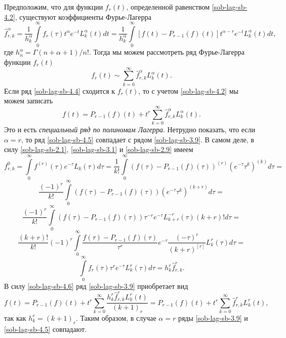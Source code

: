 Предположим, что для функции $f_r(t)$, определенной равенством \eqref{sob-lag-sb-4.2}, существуют коэффициенты Фурье-Лагерра
\begin{equation}\label{sob-lag-sb-4.3}
\hat{f}_{r,k}^\alpha=\frac1{h_k^\alpha}\int\limits_0^\infty f_r(\tau)t^\alpha e^{-t}L_k^\alpha(t)dt=
  \frac1{h_k^\alpha}\int\limits_0^\infty [f(t)-P_{r-1}(f)(t)]t^{\alpha-r}e^{-t}L_k^\alpha(t)dt,
\end{equation}
где $h_n^\alpha=\Gamma(n+\alpha+1)/n!$.
Тогда мы можем рассмотреть ряд Фурье-Лагерра функции $f_r(t)$
\begin{equation}\label{sob-lag-sb-4.4}
  f_r(t)\sim\sum\limits_{k=0}^\infty\hat{f}_{r,k}^\alpha L_k^\alpha(t).
\end{equation}
Если ряд \eqref{sob-lag-sb-4.4} сходится к $f_r(t)$, то с учетом \eqref{sob-lag-sb-4.2} мы можем записать
\begin{equation}\label{sob-lag-sb-4.5}
  f(t)=P_{r-1}(f)(t)+t^r\sum\limits_{k=0}^\infty\hat{f}_{r,k}^\alpha L_k^\alpha(t).
\end{equation}
 Это и есть \textit{специальный ряд по полиномам Лагерра}.
 Нетрудно показать, что если $\alpha=r$, то ряд \eqref{sob-lag-sb-4.5} совпадает с рядом \eqref{sob-lag-sb-3.9}. В самом деле, в силу \eqref{sob-lag-sb-2.1},  \eqref{sob-lag-sb-3.1} и \eqref{sob-lag-sb-2.9} имеем
\begin{equation*}
  {f}_{r,k}^0=\int\limits_0^\infty f^{(r)}(\tau)e^{-\tau}L_k(\tau)d\tau=\frac1{k!}\int\limits_0^\infty(f(\tau)-P_{r-1}(f)(\tau))^{(r)}(e^{-\tau}\tau^k)^{(k)}d\tau=
\end{equation*}
\begin{equation*}
  \frac{(-1)^r}{k!}\int\limits_0^\infty(f(\tau)-P_{r-1}(f)(\tau))(e^{-\tau}\tau^k)^{(k+r)}d\tau=
\end{equation*}
\begin{equation*}
  \frac{(-1)^r}{k!}\int\limits_0^\infty(f(\tau)-P_{r-1}(f)(\tau))
  \tau^{-r}e^{-\tau}L_{k+r}^{-r}(\tau)(k+r)!d\tau=
\end{equation*}
\begin{equation*}
  \frac{(k+r)!}{k!}(-1)^r\int\limits_0^\infty\frac{f(\tau)-P_{r-1}(f)(\tau)}
  {\tau^r}e^{-\tau}\frac{(-\tau)^r}{(k+r)^{[r]}}L_k^r(\tau)d\tau=
\end{equation*}
\begin{equation}\label{sob-lag-sb-4.6}
  \int\limits_0^\infty f_r(\tau)\tau^re^{-\tau}L_k^r(\tau)d\tau=h_k^r\hat{f}_{r,k}^r.
\end{equation}
В силу \eqref{sob-lag-sb-4.6} ряд \eqref{sob-lag-sb-3.9} приобретает вид
\begin{equation*}
  f(t)=P_{r-1}(f)(t)+t^r\sum\limits_{k=0}^\infty\frac{h_k^r\hat{f}_{r,k}^rL_k^r(t)}{(k+1)_r}=
  P_{r-1}(f)(t)+t^r\sum\limits_{k=0}^\infty\hat{f}_{r,k}^rL_k^r(t),
\end{equation*}
так как $h_k^r=(k+1)_r$. Таким образом, в случае $\alpha=r$ ряды \eqref{sob-lag-sb-3.9} и \eqref{sob-lag-sb-4.5} совпадают.

